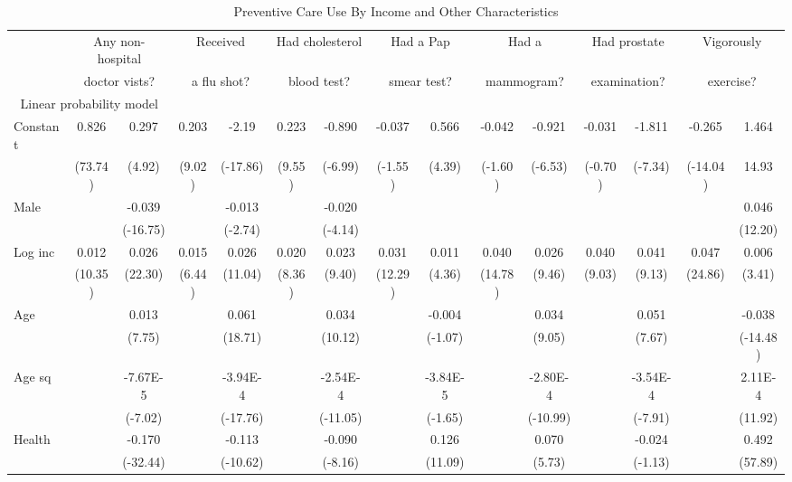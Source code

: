 \documentclass[12pt,pdftex,letterpaper]{article}
\begin{document}
\begin{table}
\caption{Preventive Care Use By Income and Other Characteristics}
\label{table:Preventive}
\centering
\footnotesize
\begin{tabular}{l c c c c c c c c c c c c c c}
\hline \hline
 & \multicolumn{2}{c}{Any non-hospital} & \multicolumn{2}{c}{Received} & \multicolumn{2}{c}{Had cholesterol} & \multicolumn{2}{c}{Had a Pap}  & \multicolumn{2}{c}{Had a} & \multicolumn{2}{c}{Had prostate} & \multicolumn{2}{c}{Vigorously}\\
 & \multicolumn{2}{c}{doctor vists?}        & \multicolumn{2}{c}{a flu shot?} & \multicolumn{2}{c}{blood test?} & \multicolumn{2}{c}{smear test?} & \multicolumn{2}{c}{mammogram?} & \multicolumn{2}{c}{examination?} & \multicolumn{2}{c}{exercise?}\\
\hline
\multicolumn{3}{c}{Linear probability model} \\
Constant & 0.826 & 0.297 & 0.203 & -2.19 & 0.223 & -0.890 & -0.037 & 0.566 & -0.042 & -0.921 & -0.031 & -1.811 & -0.265 & 1.464 \\
               & (73.74) & (4.92) & (9.02) & (-17.86) & (9.55) & (-6.99) & (-1.55) & (4.39) & (-1.60) & (-6.53) & (-0.70) & (-7.34) & (-14.04) & 14.93 \\
Male        & & -0.039 & & -0.013 & & -0.020 & & & & & & & & 0.046 \\
               & & (-16.75) & & (-2.74) & & (-4.14) & & & & & & & & (12.20) \\
Log inc    & 0.012 & 0.026 & 0.015 & 0.026 & 0.020 & 0.023 & 0.031 & 0.011 & 0.040 & 0.026 & 0.040 & 0.041 & 0.047 & 0.006 \\
               & (10.35) & (22.30) & (6.44) & (11.04) & (8.36) & (9.40) & (12.29) & (4.36) & (14.78) & (9.46) & (9.03) & (9.13) & (24.86) & (3.41) \\
Age        & & 0.013 & & 0.061 & & 0.034 & & -0.004 & & 0.034 & & 0.051 & & -0.038 \\
               & & (7.75) & & (18.71) & & (10.12) & & (-1.07) & & (9.05) & & (7.67) & & (-14.48) \\
Age sq    & & -7.67E-5 & & -3.94E-4 & & -2.54E-4 & & -3.84E-5 & & -2.80E-4 & & -3.54E-4 & & 2.11E-4 \\
               & & (-7.02) & & (-17.76) & & (-11.05) & & (-1.65) & & (-10.99) & & (-7.91) & & (11.92) \\
Health    & & -0.170 & & -0.113 & & -0.090 & & 0.126 & & 0.070 & & -0.024 & & 0.492 \\
               & & (-32.44) & & (-10.62) & & (-8.16) & & (11.09) & & (5.73) & & (-1.13) & & (57.89) \\


\end{tabular}
\end{table}
\end{document}
